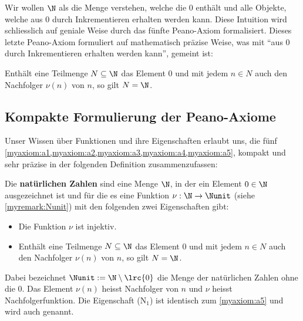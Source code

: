 \noindent
Wir wollen $\N$ als die Menge verstehen, welche die $0$ enthält und alle Objekte, welche aus $0$ durch Inkrementieren erhalten werden kann. Diese Intuition wird schliesslich auf geniale Weise durch das fünfte Peano-Axiom formalisiert. Dieses letzte Peano-Axiom formuliert auf mathematisch präzise Weise, was mit \enquote{aus $0$ durch Inkrementieren erhalten werden kann}, gemeint ist:
\begin{myaxiom}\label{myaxiom:a5}
	Enthält eine Teilmenge $N\subseteq\N$ das Element $0$ und mit jedem $n\in N$ auch den Nachfolger $\nu(n)$ von $n$, so gilt $N=\N$.
\end{myaxiom}

\subsection{Kompakte Formulierung der Peano-Axiome}\label{subsec:kompakt}
Unser Wissen über Funktionen und ihre Eigenschaften erlaubt uns, die fünf \cref{myaxiom:a1,myaxiom:a2,myaxiom:a3,myaxiom:a4,myaxiom:a5}, kompakt und sehr präzise in der folgenden Definition zusammenzufassen:
\begin{mydefinition}\label{mydefinition:N}
Die \textbf{natürlichen Zahlen} sind eine Menge $\N$, in der ein Element $0\in\N$ ausgezeichnet ist und für die es eine Funktion $\nu:\N\to\Nunit$ (siehe \cref{myremark:Nunit}) mit den folgenden zwei Eigenschaften gibt:
\begin{itemize}
	\item[(N$_0$)] Die Funktion $\nu$ ist injektiv.
	\item[(N$_1$)] Enthält eine Teilmenge $N\subseteq\N$ das Element $0$ und mit jedem $n\in N$ auch den Nachfolger $\nu(n)$ von $n$, so gilt $N=\N$.
\end{itemize}
\end{mydefinition}
Dabei bezeichnet $\Nunit:=\N\setminus{\lrc{0}}$ die Menge der natürlichen Zahlen ohne die $0$. Das Element $\nu(n)$ heisst Nachfolger von $n$ und $\nu$ heisst Nachfolgerfunktion. Die Eigenschaft (N$_1$) ist identisch zum \cref{myaxiom:a5} und wird auch  genannt.

